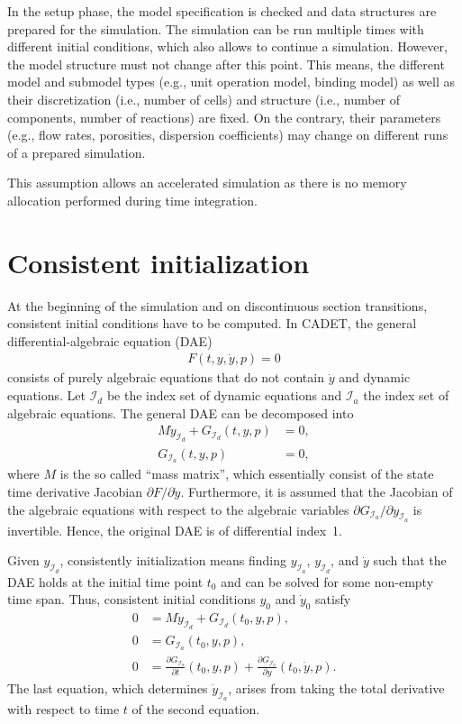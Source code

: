 In the setup phase, the model specification is checked and data structures are prepared for the simulation.
The simulation can be run multiple times with different initial conditions, which also allows to continue a simulation.
However, the model structure must not change after this point.
This means, the different model and submodel types (e.g., unit operation model, binding model) as well as their discretization (i.e., number of cells) and structure (i.e., number of components, number of reactions) are fixed.
On the contrary, their parameters (e.g., flow rates, porosities, dispersion coefficients) may change on different runs of a prepared simulation.

This assumption allows an accelerated simulation as there is no memory allocation performed during time integration.

\section{Consistent initialization}\label{sec:SimConsistentInit}

At the beginning of the simulation and on discontinuous section transitions, consistent initial conditions have to be computed. 
In CADET, the general differential-algebraic equation (DAE)
\begin{align*}
	F(t, y, \dot{y}, p) = 0
\end{align*}
consists of purely algebraic equations that do not contain $\dot{y}$ and dynamic equations.
Let $\mathcal{I}_d$ be the index set of dynamic equations and $\mathcal{I}_a$ the index set of algebraic equations.
The general DAE can be decomposed into
\begin{align}
	M \dot{y}_{\mathcal{I}_d} + G_{\mathcal{I}_d}(t, y, p) &= 0, \\
	G_{\mathcal{I}_a}(t, y, p) &= 0,
\end{align}
where $M$ is the so called ``mass matrix'', which essentially consist of the state time derivative Jacobian $\partial F / \partial \dot{y}$.
Furthermore, it is assumed that the Jacobian of the algebraic equations with respect to the algebraic variables $\partial G_{\mathcal{I}_a} / \partial y_{\mathcal{I}_a}$ is invertible.
Hence, the original DAE is of differential index~1.

Given $y_{\mathcal{I}_d}$, consistently initialization means finding $y_{\mathcal{I}_a}$, $y_{\mathcal{I}_d}$, and $\dot{y}$ such that the DAE holds at the initial time point $t_0$ and can be solved for some non-empty time span.
Thus, consistent initial conditions $y_0$ and $\dot{y}_0$ satisfy
\begin{align*}
	0 &= M \dot{y}_{\mathcal{I}_d} + G_{\mathcal{I}_d}\left(t_0, y, p\right), \\
	0 &= G_{\mathcal{I}_a}\left(t_0, y, p\right), \\
	0 &= \frac{\partial G_{\mathcal{I}_a}}{\partial t}\left(t_0, y, p\right) + \frac{\partial G_{\mathcal{I}_a}}{\partial y}\left(t_0, \dot{y}, p\right).
\end{align*}
The last equation, which determines $\dot{y}_{\mathcal{I}_a}$, arises from taking the total derivative with respect to time $t$ of the second equation.

